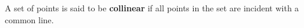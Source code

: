 A set of points is said to be \textbf{collinear} if all points in the set are incident with a common line.
